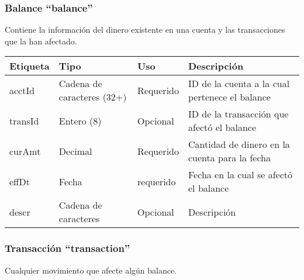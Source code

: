 \subsubsection{Balance ``balance''}
Contiene la información del dinero existente en una cuenta y las transacciones que
la han afectado.

\begin{center}
\begin{longtable}{|>{\centering\arraybackslash}p{}|>{\centering\arraybackslash}p{}|>{\centering\arraybackslash}p{}|>{\centering\arraybackslash}p{}|}
\hline 
\bfseries {Etiqueta} & \bfseries {Tipo} & \bfseries {Uso} & \bfseries {Descripción} \\ 
\hline 
acctId & Cadena de caracteres (32+) & Requerido & ID de la cuenta a la cual pertenece el balance \\ 
\hline
transId & Entero (8) & Opcional & ID de la transacción que afectó el balance \\
\hline 
curAmt & Decimal & Requerido & Cantidad de dinero en la cuenta para la fecha \\
\hline 
effDt & Fecha & requerido & Fecha en la cual se afectó el balance \\
\hline 
descr & Cadena de caracteres & Opcional & Descripción \\
\hline 
\end{longtable}
\end{center}

\subsubsection{Transacción ``transaction''}
Cualquier movimiento que afecte algún balance.

